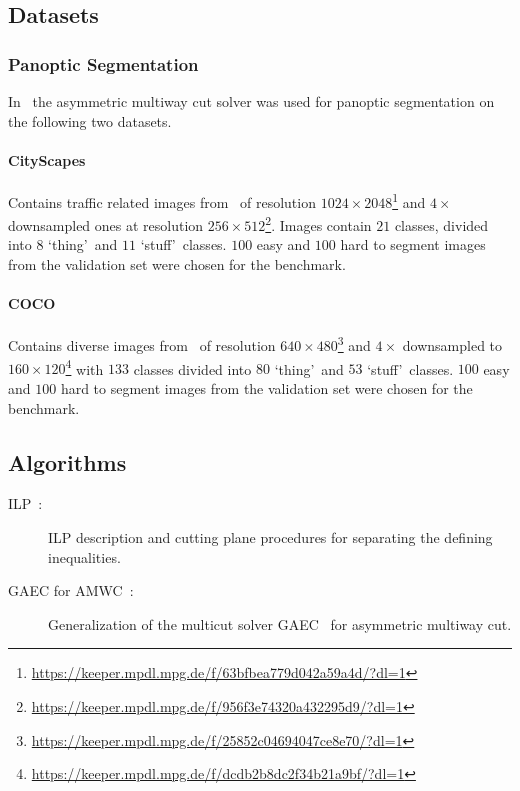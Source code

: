 \subsection{Datasets}

\subsubsection{Panoptic Segmentation}
In~\cite{abbas2021combinatorial} the asymmetric multiway cut solver was used for panoptic segmentation on the following two datasets.

\paragraph{CityScapes}
Contains traffic related images from~\cite{cordts2016cityscapes} of resolution $1024 \times 2048$\footnote{\url{https://keeper.mpdl.mpg.de/f/63bfbea779d042a59a4d/?dl=1}} and $4 \times$ downsampled ones at resolution $256 \times 512$\footnote{\url{https://keeper.mpdl.mpg.de/f/956f3e74320a432295d9/?dl=1}}.
Images contain $21$ classes, divided into $8$ \lq thing\rq\ and $11$ \lq stuff\rq\ classes.
$100$ easy and $100$ hard to segment images from the validation set were chosen for the benchmark. 

\paragraph{COCO}
Contains diverse images from~\cite{lin2014microsoft} of resolution $640 \times 480$\footnote{\url{https://keeper.mpdl.mpg.de/f/25852c04694047ce8e70/?dl=1}} and $4 \times$ downsampled to $160 \times 120$\footnote{\url{https://keeper.mpdl.mpg.de/f/dcdb2b8dc2f34b21a9bf/?dl=1}} with $133$ classes divided into $80$ \lq thing\rq\ and $53$ \lq stuff\rq\ classes.
$100$ easy and $100$ hard to segment images from the validation set were chosen for the benchmark. 

\subsection{Algorithms}
\begin{description}
\item[ILP~\cite{kroeger2014asymmetric}:] ILP description and cutting plane procedures for separating the defining inequalities.
\item[GAEC for AMWC~\cite{abbas2021combinatorial}:] Generalization of the multicut solver GAEC~\cite{keuper2015efficient} for asymmetric multiway cut.
\end{description}
